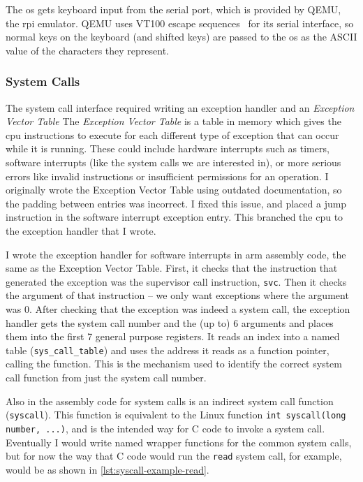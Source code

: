 \documentclass{article}
\begin{document}
The \gls{os} gets keyboard input from the serial port, which is provided by
QEMU, the \gls{rpi} emulator. QEMU uses VT100 escape sequences~\cite{vt100} for
its serial interface, so normal keys on the keyboard (and shifted keys) are
passed to the \gls{os} as the ASCII value of the characters they represent.

\subsubsection{System Calls}
\label{sec:impl_syscalls}
The system call interface required writing an exception handler and an
\emph{Exception Vector Table} The \emph{Exception Vector Table} is a
table in memory which gives the \gls{cpu} instructions to execute for each
different type of exception that can occur while it is running. These could
include hardware interrupts such as timers, software interrupts (like the
system calls we are interested in), or more serious errors like invalid
instructions or insufficient permissions for an operation. I originally wrote
the Exception Vector Table using outdated documentation, so the padding between
entries was incorrect. I fixed this issue, and placed a jump instruction in the
software interrupt exception entry. This branched the \gls{cpu} to the
exception handler that I wrote.

I wrote the exception handler for software interrupts in \gls{arm} assembly
code, the same as the Exception Vector Table. First, it checks that the
instruction that generated the exception was the supervisor call instruction,
\verb!svc!. Then it checks the argument of that instruction -- we only want
exceptions where the argument was 0. After checking that the exception was
indeed a system call, the exception handler gets the system call number and the
(up to) 6 arguments and places them into the first 7 general purpose registers.
It reads an index into a named table (\verb!sys_call_table!) and uses the
address it reads as a function pointer, calling the function. This is the
mechanism used to identify the correct system call function from just the
system call number.

Also in the assembly code for system calls is an indirect system call function
(\verb!syscall!). This function is equivalent to the Linux function
\verb!int syscall(long number, ...)!, and is the intended way for C code to
invoke a system call. Eventually I would write named wrapper functions for the
common system calls, but for now the way that C code would run the
\texttt{read} system call, for example, would be as shown in
\autoref{lst:syscall-example-read}.
\end{document}
